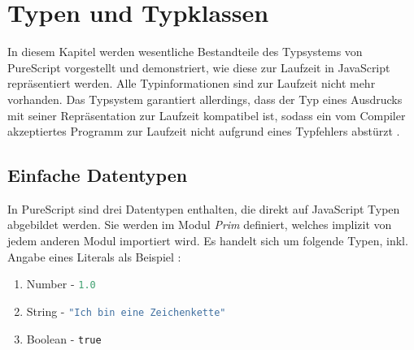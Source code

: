 \documentclass[
12pt,
ngerman,
oneside]
{scrbook} %
\begin{document}
\chapter{Typen und Typklassen}
\label{typesAndTypeClasses}
In diesem Kapitel werden wesentliche Bestandteile des Typsystems von PureScript vorgestellt und demonstriert, wie diese zur Laufzeit in JavaScript repräsentiert werden. Alle Typinformationen sind zur Laufzeit nicht mehr vorhanden. Das Typsystem garantiert allerdings, dass der Typ eines Ausdrucks mit seiner Repräsentation zur Laufzeit kompatibel ist, sodass ein vom Compiler akzeptiertes Programm zur Laufzeit nicht aufgrund eines Typfehlers abstürzt \cite[][S. 144, 148]{Freeman17}.

\section{Einfache Datentypen}
In PureScript sind drei Datentypen enthalten, die direkt auf JavaScript Typen abgebildet werden. Sie werden im Modul \emph{Prim} definiert, welches implizit von jedem anderen Modul importiert wird. Es handelt sich um folgende Typen, inkl. Angabe eines Literals als Beispiel  \cite[][S. 16]{Freeman17}: 
\begin{enumerate}
	\item Number - \lstinline[language=purescript, columns=fixed]{1.0}
	\item String - \lstinline[language=purescript, columns=fixed]{"Ich bin eine Zeichenkette"}
	\item Boolean - \lstinline[language=purescript, columns=fixed]{true}
\end{enumerate}
\end{document}
